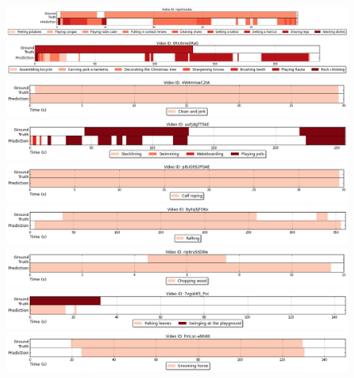 \begin{figure}[H]
\begin{center}
\includegraphics[width=1\linewidth]{img/results/activity_detection_multiple/activity_detection_sample_0}
\includegraphics[width=1\linewidth]{img/results/activity_detection_multiple/activity_detection_sample_1}
\includegraphics[width=1\linewidth]{img/results/activity_detection_multiple/activity_detection_sample_2}
\includegraphics[width=1\linewidth]{img/results/activity_detection_multiple/activity_detection_sample_3}
\includegraphics[width=1\linewidth]{img/results/activity_detection_multiple/activity_detection_sample_4}
\includegraphics[width=1\linewidth]{img/results/activity_detection_multiple/activity_detection_sample_5}
\includegraphics[width=1\linewidth]{img/results/activity_detection_multiple/activity_detection_sample_6}
\includegraphics[width=1\linewidth]{img/results/activity_detection_multiple/activity_detection_sample_7}
\includegraphics[width=1\linewidth]{img/results/activity_detection_multiple/activity_detection_sample_8}

\end{center}
\end{figure}
